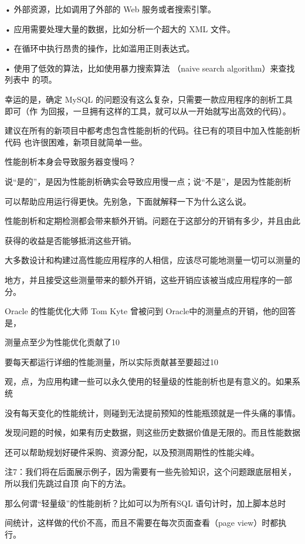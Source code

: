 • 外部资源，比如调用了外部的 Web 服务或者搜索引擎。

• 应用需要处理大量的数据，比如分析一个超大的 XML 文件。

• 在循环中执行昂贵的操作，比如滥用正则表达式。

• 使用了低效的算法，比如使用暴力搜索算法 （naive search algorithm）来查找列表中
的项。

幸运的是，确定 MySQL 的问题没有这么复杂，只需要一款应用程序的剖析工具即可（作
为回报，一旦拥有这样的工具，就可以从一开始就写出高效的代码）。

建议在所有的新项目中都考虑包含性能剖析的代码。往已有的项目中加入性能剖析代码
也许很困难，新项目就简单一些。

性能剖析本身会导致服务器变慢吗？

说“是的”，是因为性能剖析确实会导致应用慢一点；说“不是”，是因为性能剖析

可以帮助应用运行得更快。先别急，下面就解释一下为什么这么说。

性能剖析和定期检测都会带来额外开销。问题在于这部分的开销有多少，并且由此

获得的收益是否能够抵消这些开销。

大多数设计和构建过高性能应用程序的人相信，应该尽可能地测量一切可以测量的

地方，并且接受这些测量带来的额外开销，这些开销应该被当成应用程序的一部分。

Oracle 的性能优化大师 Tom Kyte 曾被问到 Oracle中的测量点的开销，他的回答是，

测量点至少为性能优化贡献了10%

要每天都运行详细的性能测量，所以实际贡献甚至要超过10%

观，点，为应用构建一些可以永久使用的轻量级的性能剖析也是有意义的。如果系统

没有每天变化的性能统计，则碰到无法提前预知的性能瓶颈就是一件头痛的事情。

发现问题的时候，如果有历史数据，则这些历史数据价值是无限的。而且性能数据

还可以帮助规划好硬件采购、资源分配，以及预测周期性的性能尖峰。

注7：我们将在后面展示例子，因为需要有一些先验知识，这个问题跟底层相关，所以我们先跳过自顶
向下的方法。

那么何谓“轻量级”的性能剖析？比如可以为所有SQL 语句计时，加上脚本总时

间统计，这样做的代价不高，而且不需要在每次页面查看（page view）时都执行。

